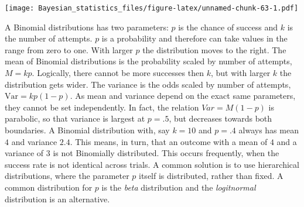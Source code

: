 \documentclass[]{svmono}
\newenvironment{Shaded}{\begin{snugshade}}{\end{snugshade}}
\newcommand{\KeywordTok}[1]{\textcolor[rgb]{0.13,0.29,0.53}{\textbf{#1}}}
\newcommand{\DataTypeTok}[1]{\textcolor[rgb]{0.13,0.29,0.53}{#1}}
\newcommand{\DecValTok}[1]{\textcolor[rgb]{0.00,0.00,0.81}{#1}}
\newcommand{\FloatTok}[1]{\textcolor[rgb]{0.00,0.00,0.81}{#1}}
\newcommand{\StringTok}[1]{\textcolor[rgb]{0.31,0.60,0.02}{#1}}
\newcommand{\OperatorTok}[1]{\textcolor[rgb]{0.81,0.36,0.00}{\textbf{#1}}}
\newcommand{\NormalTok}[1]{#1}
\theoremstyle{definition}
\theoremstyle{definition}
\theoremstyle{definition}
\theoremstyle{remark}
\begin{document}
\begin{Shaded}
\end{Shaded}

\texttt{[image: Bayesian\_statistics\_files/figure-latex/unnamed-chunk-63-1.pdf]}

A Binomial distributions has two parameters: \(p\) is the chance of
success and \(k\) is the number of attempts. \(p\) is a probability and
therefore can take values in the range from zero to one. With larger
\(p\) the distribution moves to the right. The mean of Binomial
distributions is the probability scaled by number of attempts,
\(M = kp\). Logically, there cannot be more successes then \(k\), but
with larger \(k\) the distribution gets wider. The variance is the odds
scaled by number of attempts, \(\textrm{Var} = kp(1-p)\). As mean and
variance depend on the exact same parameters, they cannot be set
independently. In fact, the relation \(Var = M(1-p)\) is parabolic, so
that variance is largest at \(p = .5\), but decreases towards both
boundaries. A Binomial distribution with, say \(k=10\) and \(p = .4\)
always has mean \(4\) and variance \(2.4\). This means, in turn, that an
outcome with a mean of \(4\) and a variance of \(3\) is not Binomially
distributed. This occurs frequently, when the success rate is not
identical across trials. A common solution is to use hierarchical
distributions, where the parameter \(p\) itself is distributed, rather
than fixed. A common distribution for \(p\) is the \emph{beta}
distribution and the \emph{logitnormal} distribution is an alternative.
\end{document}
